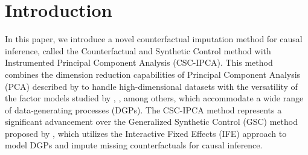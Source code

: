 \documentclass[12pt]{article}
\begin{document}
\pagebreak \newpage
\doublespacing

\section{Introduction} 
\label{sec: introduction}
In this paper, we introduce a novel counterfactual imputation method for causal inference, called the Counterfactual and Synthetic Control method with Instrumented Principal Component Analysis (CSC-IPCA). This method combines the dimension reduction capabilities of Principal Component Analysis (PCA) described by \cite{jollife2016principal} to handle high-dimensional datasets with the versatility of the factor models studied by \cite{bai2003computation}, \cite{bai2009panel}, among others, which accommodate a wide range of data-generating processes (DGPs). The CSC-IPCA method represents a significant advancement over the Generalized Synthetic Control (GSC) method proposed by \cite{xu2017generalized}, which utilizes the Interactive Fixed Effects (IFE) approach to model DGPs and impute missing counterfactuals for causal inference.

\clearpage
\begingroup
{}


\endgroup
\end{document}
